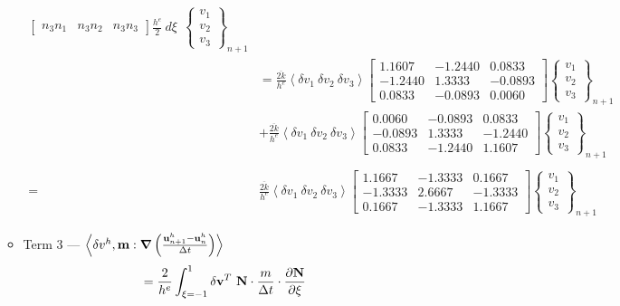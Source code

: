 \begin{itemize}
\begin{itemize}
\begin{align*}
\begin{bmatrix}
n_3n_1 & n_3n_2 & n_3n_3  
\end{bmatrix}\frac{h^e}{2}\ d\xi \ \ 
\begin{Bmatrix}
v_1\\v_2\\v_3
\end{Bmatrix}_{n+1}\\
& =  \frac{\overline{2k}}{h^e}
\left< \delta v_1\ \delta v_2\ \delta v_3 \right>
\begin{bmatrix}
1.1607  & -1.2440 &   0.0833\\
 -1.2440 &   1.3333 &  -0.0893\\
 0.0833  &  -0.0893  &  0.0060
\end{bmatrix}
\begin{Bmatrix}
v_1\\v_2\\v_3
\end{Bmatrix}_{n+1}\\
& + \frac{\overline{2k}}{h^e}
\left< \delta v_1\ \delta v_2\ \delta v_3 \right>
\begin{bmatrix}
0.0060 &  -0.0893  &  0.0833 \\
-0.0893 &   1.3333  & -1.2440 \\
0.0833  & -1.2440   & 1.1607
\end{bmatrix}
\begin{Bmatrix}
v_1\\v_2\\v_3
\end{Bmatrix}_{n+1} \\ \\
= & 
\frac{\overline{2k}}{h^e}
\left< \delta v_1\ \delta v_2\ \delta v_3 \right>
\begin{bmatrix}
 1.1667 &   -1.3333 &   0.1667\\
   -1.3333 &   2.6667 &  -1.3333\\
    0.1667 &  -1.3333 &   1.1667
\end{bmatrix}
\begin{Bmatrix}
v_1\\v_2\\v_3
\end{Bmatrix}_{n+1} 
\end{align*}
\item Term 3 --- $\left<
\delta v^h , {\bf m} : {\bm\nabla}
\left(
\frac{{\bf u}^h_{n+1} - {\bf u}^h_{n}}{\Delta t}
\right)
\right> $
\begin{align*}
& =  
\frac{2}{h^e} \int_{\xi = -1}^{1} \delta{\bf v}^T\ {\bf N} \cdot \frac{m}{\Delta t} \cdot \del{\bf N}{\xi} 

\end{align*}
\end{itemize}
\end{itemize}
